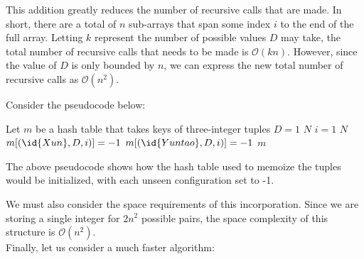     This addition greatly reduces the number of recursive calls that are made.
    In short, there are a total of $n$ sub-arrays that span some index $i$ to the end of the full array.
    Letting $k$ represent the number of possible values $D$ may take, the total number of recursive calls that needs to be made is $\mathcal{O}(kn)$.
    However, since the value of $D$ is only bounded by $n$, we can express the new total number of recursive calls as $\mathcal{O}(n^2)$.

    Consider the pseudocode below:

    \begin{spacing}{1.2}
        \begin{codebox}
        \li Let $m$ be a hash table that takes keys of three-integer tuples
        \li \For $D = 1$ \To $N$
        \Do
            \li \For $i = 1$ \To $N$
            \Do
                \li $m[(\id{Xun}, D, i)] = -1$
                \li $m[(\id{Yuntao}, D, i)] = -1$
            \End
        \End
        \li \Return $m$
        \end{codebox}
    \end{spacing}
    \vspace{5mm}

    The above pseudocode shows how the hash table used to memoize the tuples would be initialized, with each unseen configuration set to -1.
    
    We must also consider the space requirements of this incorporation. Since we are storing a single integer for $2n^2$ possible pairs, the space complexity of this structure is $\mathcal{O}(n^2)$. \\

    Finally, let us consider a much faster algorithm:
    
